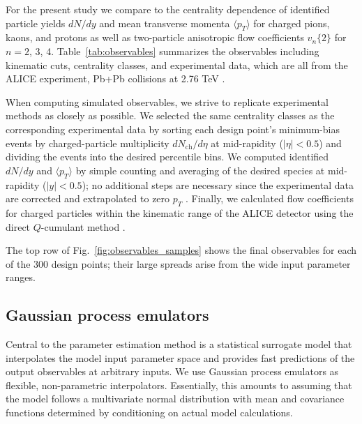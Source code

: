 \documentclass[aps,prc,reprint,amsmath,nofootinbib,superscriptaddress]{revtex4-1}
\newcommand{\avg}[1]{\langle #1 \rangle}
\newcommand{\nch}{N_\text{ch}}
\newcommand{\vnk}[2]{v_#1\{#2\}}
\begin{document}
For the present study we compare to the centrality dependence of identified particle yields $dN/dy$ and mean transverse momenta $\avg{p_T}$ for charged pions, kaons, and protons as well as two-particle anisotropic flow coefficients $\vnk n 2$ for $n = 2$, 3, 4.
Table~\ref{tab:observables} summarizes the observables including kinematic cuts, centrality classes, and experimental data, which are all from the ALICE experiment, Pb+Pb collisions at 2.76 TeV \cite{Abelev:2013vea,ALICE:2011ab}.

When computing simulated observables, we strive to replicate experimental methods as closely as possible.
We selected the same centrality classes as the corresponding experimental data by sorting each design point's minimum-bias events by charged-particle multiplicity $d\nch/d\eta$ at mid-rapidity ($|\eta| < 0.5$) and dividing the events into the desired percentile bins.
We computed identified $dN/dy$ and $\avg{p_T}$ by simple counting and averaging of the desired species at mid-rapidity ($|y| < 0.5$); no additional steps are necessary since the experimental data are corrected and extrapolated to zero $p_T$ \cite{Abelev:2013vea}.
Finally, we calculated flow coefficients for charged particles within the kinematic range of the ALICE detector using the direct $Q$-cumulant method \cite{Bilandzic:2010jr}.

The top row of Fig.~\ref{fig:observables_samples} shows the final observables for each of the 300 design points;
their large spreads arise from the wide input parameter ranges.

\subsection{Gaussian process emulators}

\newcommand{\x}{\mathbf x}
\newcommand{\y}{\mathbf y}
\newcommand{\N}{\mathcal N}
\newcommand{\muvec}{\boldsymbol\mu}
\newcommand{\tran}{^\intercal}

Central to the parameter estimation method is a statistical surrogate model that interpolates the model input parameter space and provides fast predictions of the output observables at arbitrary inputs.
We use Gaussian process emulators \cite{Rasmussen:2006gp} as flexible, non-parametric interpolators.
Essentially, this amounts to assuming that the model follows a multivariate normal distribution with mean and covariance functions determined by conditioning on actual model calculations.
\end{document}
